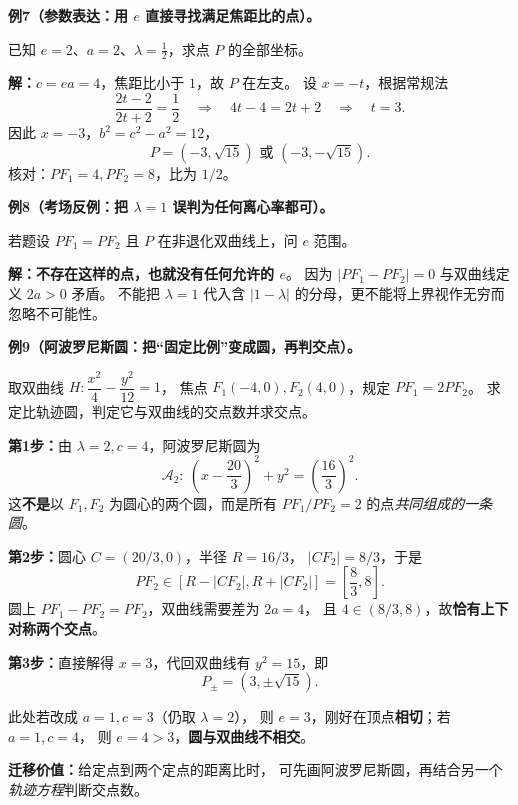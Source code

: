 \clearpage
\begin{examplebox}
\textbf{例7（参数表达：用 $e$ 直接寻找满足焦距比的点）。}

已知 $e=2$、$a=2$、$\lambda=\tfrac12$，求点 $P$ 的全部坐标。

\textbf{解：}$c=ea=4$，焦距比小于 $1$，故 $P$ 在左支。
设 $x=-t$，根据常规法
\[
\frac{2t-2}{2t+2}=\frac12
\quad\Longrightarrow\quad 4t-4=2t+2
\quad\Longrightarrow\quad t=3.
\]
因此 $x=-3$，$b^2=c^2-a^2=12$，
\[
\boxed{P=(-3,\sqrt{15})\text{ 或 }(-3,-\sqrt{15})}.
\]
核对：$PF_1=4, PF_2=8$，比为 $1/2$。

\medskip
\textbf{例8（考场反例：把 $\lambda=1$ 误判为任何离心率都可）。}

若题设 $PF_1=PF_2$ 且 $P$ 在非退化双曲线上，问 $e$ 范围。

\textbf{解：}\textbf{不存在这样的点，也就没有任何允许的 $e$}。
因为 $|PF_1-PF_2|=0$ 与双曲线定义 $2a>0$ 矛盾。
不能把 $\lambda=1$ 代入含 $|1-\lambda|$ 的分母，更不能将上界视作无穷而忽略不可能性。
\end{examplebox}


\clearpage
\begin{examplebox}
\textbf{例9（阿波罗尼斯圆：把“固定比例”变成圆，再判交点）。}

取双曲线 $H:\dfrac{x^2}{4}-\dfrac{y^2}{12}=1$，
焦点 $F_1(-4,0),F_2(4,0)$，规定 $PF_1=2PF_2$。
求定比轨迹圆，判定它与双曲线的交点数并求交点。

\textbf{第1步：}由 $\lambda=2,c=4$，阿波罗尼斯圆为
\[
\boxed{\mathcal A_2:\ \left(x-\frac{20}{3}\right)^2+y^2
=\left(\frac{16}{3}\right)^2}.
\]
这\textbf{不是}以 $F_1,F_2$ 为圆心的两个圆，而是所有 $PF_1/PF_2=2$ 的点\emph{共同组成的一条圆}。

\textbf{第2步：}圆心 $C=(20/3,0)$，半径 $R=16/3$，
$|CF_2|=8/3$，于是
\[
PF_2\in[R-|CF_2|,R+|CF_2|]=\left[\frac83,8\right].
\]
圆上 $PF_1-PF_2=PF_2$，双曲线需要差为 $2a=4$，
且 $4\in(8/3,8)$，故\textbf{恰有上下对称两个交点}。

\textbf{第3步：}直接解得 $x=3$，代回双曲线有 $y^2=15$，即
\[
\boxed{P_\pm=(3,\pm\sqrt{15})}.
\]

此处若改成 $a=1,c=3$（仍取 $\lambda=2$），
则 $e=3$，刚好在顶点\textbf{相切}；若 $a=1,c=4$，
则 $e=4>3$，\textbf{圆与双曲线不相交}。

\textbf{迁移价值：}给定点到两个定点的距离比时，
可先画阿波罗尼斯圆，再结合另一个\emph{轨迹方程}判断交点数。
\end{examplebox}
